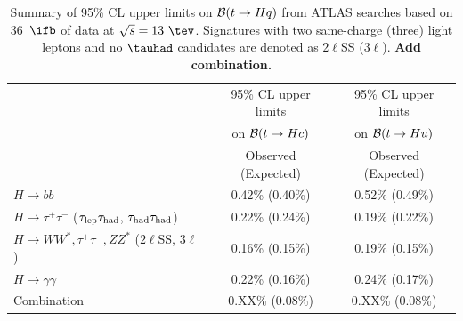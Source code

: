 \begin{table}[t!]
\begin{center}
\begin{tabular}{lcc}
\toprule\toprule
 & \multicolumn{1}{c}{95\% CL upper limits} & \multicolumn{1}{c}{95\% CL upper limits}  \\
 & \multicolumn{1}{c}{on $\mathcal{B}(t \to Hc)$} & \multicolumn{1}{c}{on $\mathcal{B}(t \to Hu)$} \\
 &  Observed (Expected) & Observed (Expected)  \\
\midrule\midrule
$H \to b\bar{b}$ & 0.42\% (0.40\%) & 0.52\% (0.49\%) \\
$H \to \tau^+\tau^-$ ($\tau_{\mathrm{lep}} \tau_{\mathrm{had}}$, $\tau_{\mathrm{had}} \tau_{\mathrm{had}}$) & 0.22\% (0.24\%) & 0.19\% (0.22\%) \\ 
$H \to WW^*, \tau^+\tau^-, ZZ^*$ ($2\ell$SS, $3\ell$)~\cite{Aaboud:2018pob}  & 0.16\% (0.15\%) & 0.19\% (0.15\%) \\ 
$H \to \gamma\gamma$~\cite{Aaboud:2017mfd} & 0.22\% (0.16\%) & 0.24\% (0.17\%) \\
\midrule
Combination  & 0.XX\% (0.08\%) & 0.XX\% (0.08\%) \\
\bottomrule\bottomrule
\end{tabular}
\caption{\small{Summary of 95\% CL upper limits on $\mathcal{B}(t \to Hq)$ from ATLAS searches based on 
36~$\ifb$ of data at $\sqrt{s}=13~\tev$. Signatures with two same-charge (three) light leptons and no $\tauhad$ candidates
are denoted as $2\ell$SS ($3\ell$). \textbf{Add combination.}}}
\label{tab:limits_summary}
\end{center}
\end{table}

